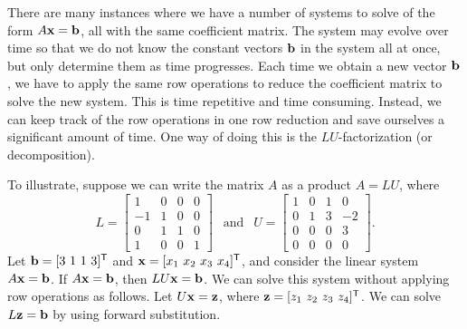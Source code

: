 \label{sec:mtx_lu_factor}

There are many instances where we have a number of systems to solve of the form $A \mathbf{x} = \mathbf{b}$, all with the same coefficient matrix. The system may evolve over time so that we do not know the constant vectors $\mathbf{b}$ in the system all at once, but only determine them as time progresses. Each time we obtain a new vector $\mathbf{b}$, we have to apply the same row operations to reduce the coefficient matrix to solve the new system. This is time repetitive and time consuming. Instead, we can keep track of the row operations in one row reduction and save ourselves a significant amount of time. One way of doing this is the $LU$-factorization (or decomposition). 

To illustrate, suppose we can write the matrix $A$ as a product $A = LU$,
where 
\[L = \left[ \begin{array}{rccc} 1&0&0&0\\-1&1&0&0 \\0&1&1&0\\1&0&0&1\end{array}  \right] \ \ \text{ and } \ \ U = \left[ \begin{array}{ccrr} 1&0&1&0\\0&1&3&-2 \\0&0&0&3\\0&0&0&0\end{array}  \right].\]
Let $\mathbf{b} = [3 \ 1 \ 1 \ 3]^{\mathsf{T}}$ and $\mathbf{x} = [x_1 \ x_2 \ x_3 \ x_4]^{\mathsf{T}}$, and consider the linear system $A \mathbf{x} = \mathbf{b}$. If $A \mathbf{x} = \mathbf{b}$, then $LU \mathbf{x} = \mathbf{b}$. We can solve this system without applying row operations as follows. Let $U\mathbf{x} = \mathbf{z}$, where $\mathbf{z} = [z_1 \ z_2 \ z_3 \ z_4]^{\mathsf{T}}$. We can solve $L\mathbf{z} = \mathbf{b}$ by using forward substitution.

